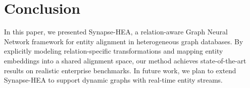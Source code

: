\section{Conclusion}
In this paper, we presented Synapse-HEA, a relation-aware Graph Neural Network framework for entity alignment in heterogeneous graph databases. By explicitly modeling relation-specific transformations and mapping entity embeddings into a shared alignment space, our method achieves state-of-the-art results on realistic enterprise benchmarks. In future work, we plan to extend Synapse-HEA to support dynamic graphs with real-time entity streams.
